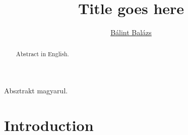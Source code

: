 \documentclass{diploma_style}
\author{\href{mailto:balint.balazs@embl.de}{Bálint Balázs}}
\title{Title goes here}
\begin{document}
\maketitle
{}





\begin{absztrakt}
Absztrakt magyarul.
\end{absztrakt}

\begin{abstract}
Abstract in English.
\end{abstract}



\tableofcontents
\setcounter{page}{1}

\chapter*{Introduction}
\cite{huisken_optical_2004}
\end{document}
